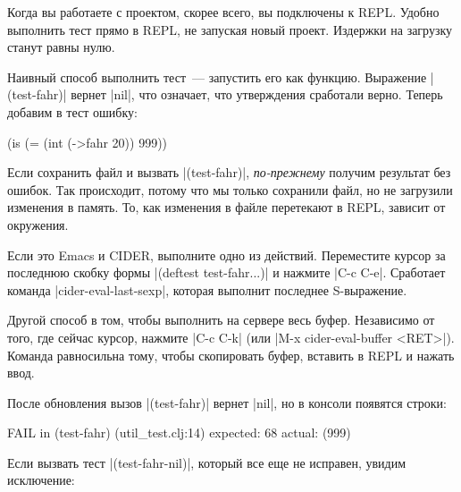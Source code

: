 Когда вы работаете с проектом, скорее всего, вы подключены к REPL. Удобно
выполнить тест прямо в REPL, не запуская новый проект. Издержки на загрузку
станут равны нулю.

Наивный способ выполнить тест~--- запустить его как функцию. Выражение
\spverb|(test-fahr)| вернет \spverb|nil|, что означает, что утверждения
сработали верно. Теперь добавим в тест ошибку:

\begin{english}
  \begin{clojure}
(is (= (int (->fahr 20)) 999))
  \end{clojure}
\end{english}

Если сохранить файл и вызвать \spverb|(test-fahr)|, \emph{по-прежнему} получим
результат без ошибок. Так происходит, потому что мы только сохранили файл, но не
загрузили изменения в память. То, как изменения в файле перетекают в REPL,
зависит от окружения.

Если это Emacs и CIDER, выполните одно из действий. Переместите курсор за
последнюю скобку формы \spverb|(deftest test-fahr...)| и нажмите \spverb|C-c C-e|.
Сработает команда \spverb|cider-eval-last-sexp|, которая выполнит последнее S-выражение.

Другой способ в том, чтобы выполнить на сервере весь буфер. Независимо от того,
где сейчас курсор, нажмите \spverb|C-c C-k| (или \spverb|M-x cider-eval-buffer <RET>|).
Команда равносильна тому, чтобы скопировать буфер, вставить в REPL и нажать ввод.

После обновления вызов \spverb|(test-fahr)| вернет \spverb|nil|, но в консоли
появятся строки:

\begin{english}
  \begin{clojure}
FAIL in (test-fahr) (util_test.clj:14)
expected: 68
  actual: (999)
  \end{clojure}
\end{english}

Если вызвать тест \spverb|(test-fahr-nil)|, который все еще не исправен, увидим
исключение:

\begin{english}
\end{english}

